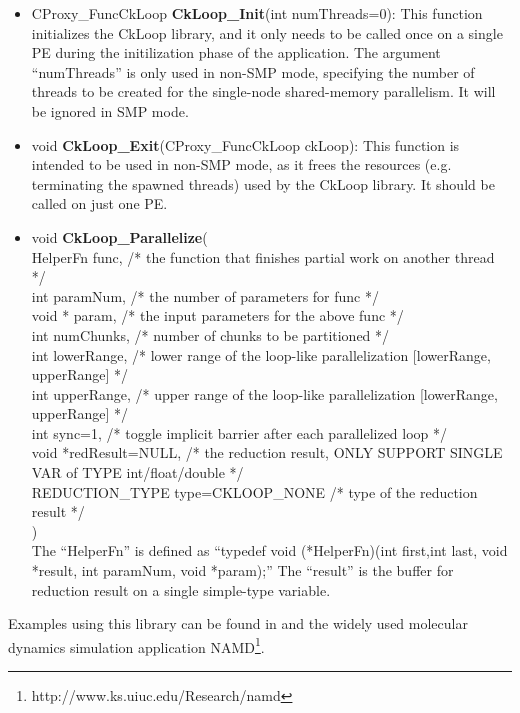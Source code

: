 \begin{itemize}
\item CProxy\_FuncCkLoop \textbf{CkLoop\_Init}(int
numThreads=0): This function initializes the CkLoop library, and it only needs
to be called once on a single PE during the initilization phase of the
application.  The argument ``numThreads'' is only used in non-SMP mode,
specifying the number of threads to be created for the single-node shared-memory
parallelism. It will be ignored in SMP mode.

\item void \textbf{CkLoop\_Exit}(CProxy\_FuncCkLoop ckLoop): This function is
intended to be used in non-SMP mode, as it frees the resources
(e.g. terminating the spawned threads) used by the CkLoop library. It should
be called on just one PE.

\item void \textbf{CkLoop\_Parallelize}( \\
HelperFn func, /* the function that finishes partial work on another thread */ \\
int paramNum, /* the number of parameters for func */\\
void * param, /* the input parameters for the above func */ \\
int numChunks, /* number of chunks to be partitioned */ \\
int lowerRange, /* lower range of the loop-like parallelization [lowerRange, upperRange] */ \\
int upperRange, /* upper range of the loop-like parallelization [lowerRange, upperRange] */ \\
int sync=1, /* toggle implicit barrier after each parallelized loop */ \\
void *redResult=NULL, /* the reduction result, ONLY SUPPORT SINGLE VAR of TYPE int/float/double */ \\
REDUCTION\_TYPE type=CKLOOP\_NONE /* type of the reduction result */ \\
) \\
The ``HelperFn'' is defined as ``typedef void (*HelperFn)(int first,int last, void *result, int paramNum, void *param);'' The ``result'' is the buffer for reduction result on a single simple-type variable.
\end{itemize}

Examples using this library can be found in  and the
widely used molecular dynamics simulation application
NAMD\footnote{http://www.ks.uiuc.edu/Research/namd}.



